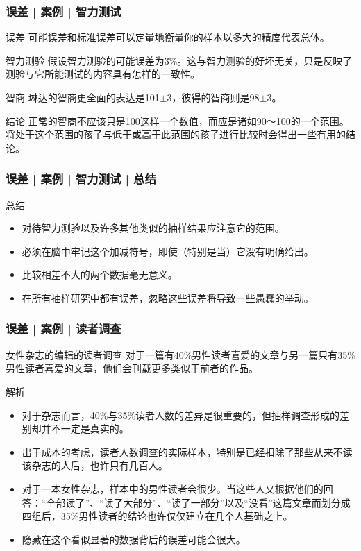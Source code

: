 \begin{frame}
  \frametitle{误差 | 案例 | 智力测试}
  \begin{block}{误差}
    可能误差和标准误差可以定量地衡量你的样本以多大的精度代表总体。
  \end{block}
  \pause
  \begin{block}{智力测验}
    假设智力测验的可能误差为3\%。这与智力测验的好坏无关，只是反映了测验与它所能测试的内容具有怎样的一致性。
  \end{block}
  \pause
  \begin{block}{智商}
    琳达的智商更全面的表达是101$\pm$3，彼得的智商则是98$\pm$3。
  \end{block}
  \pause
  \begin{block}{结论}
    正常的智商不应该只是100这样一个数值，而应是诸如90～100的一个范围。将处于这个范围的孩子与低于或高于此范围的孩子进行比较时会得出一些有用的结论。
  \end{block}
\end{frame}

\begin{frame}
  \frametitle{误差 | 案例 | 智力测试 | 总结}
  \begin{block}{总结}
    \begin{itemize}
      \item 对待智力测验以及许多其他类似的抽样结果应注意它的范围。
      \item 必须在脑中牢记这个加减符号，即使（特别是当）它没有明确给出。
      \item 比较相差不大的两个数据毫无意义。
      \item 在所有抽样研究中都有误差，忽略这些误差将导致一些愚蠢的举动。
    \end{itemize}
  \end{block}
\end{frame}

\begin{frame}
  \frametitle{误差 | 案例 | 读者调查}
  \begin{block}{女性杂志的编辑的读者调查}
    对于一篇有40\%男性读者喜爱的文章与另一篇只有35\%男性读者喜爱的文章，他们会刊载更多类似于前者的作品。
  \end{block}
  \pause \pause \pause \pause
  \begin{block}{解析}
    \begin{itemize}
      \item 对于杂志而言，40\%与35\%读者人数的差异是很重要的，但抽样调查形成的差别却并不一定是真实的。
      \item 出于成本的考虑，读者人数调查的实际样本，特别是已经扣除了那些从来不读该杂志的人后，也许只有几百人。
      \item 对于一本女性杂志，样本中的男性读者会很少。当这些人又根据他们的回答：“全部读了”、“读了大部分”、“读了一部分”以及“没看”这篇文章而划分成四组后，35\%男性读者的结论也许仅仅建立在几个人基础之上。
      \item 隐藏在这个看似显著的数据背后的误差可能会很大。
    \end{itemize}
  \end{block}
\end{frame}

